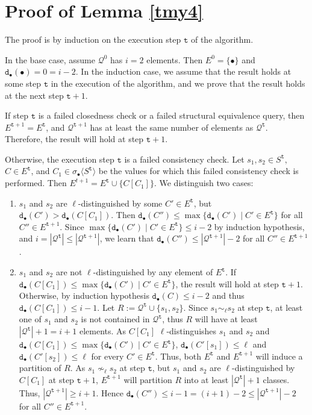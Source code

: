 \documentclass[preprint,12pt,english]{article}
\def\hole{\bullet}
\def\cQ{\mathcal{Q}}
\def\depth{\mathtt{d}}
\newcommand\pair[1]{\langle{#1}\rangle}
\def\ty{\mathtt{t}}
\begin{document}
\section{Proof of Lemma \ref{tmy4}}
The proof is by induction on the execution step $\ty$ of the algorithm.

In the base case, assume $\cQ^0$ has $i=2$ elements. Then $E^0=\{\hole\}$ and $\depth_\hole(\hole)=0=i-2.$
In the induction case, we assume that the result holds at some step $\ty$ in the execution of the algorithm, and we prove that the result holds at the next step $\ty+1.$ 

If step $\ty$ is a failed closedness check or a failed structural equivalence query, then $E^{\ty+1}=E^{\ty}$, and $\cQ^{\ty+1}$ has at least the same number of elements as $\cQ^{\ty}.$ Therefore, the result will hold at step $\ty+1.$

Otherwise, the execution step $\ty$ is a failed consistency check. Let $s_1,s_2\in S^\ty,$ $C\in E^\ty$, and $C_1\in\sigma_\hole\pair{S^\ty}$ be the values for which this failed consistency check is performed. Then $E^{t+1}=E^{\ty}\cup\{C[C_1]\}$. We distinguish two cases:
\begin{enumerate}
\item $s_1$ and $s_2$ are  $\ell$-distinguished by some $C'\in E^{\ty}$, but  $\depth_\hole(C')>\depth_\hole(C[C_1]).$ Then  $\depth_\hole(C'')\leq \max\{\depth_\hole(C')\mid C'\in E^{\ty}\}$ for all $C''\in E^{\ty+1}$. Since $\max\{\depth_\hole(C')\mid C'\in E^{\ty}\}\leq i-2$  by induction hypothesis, and $i=|\cQ^{\ty}|\leq |\cQ^{\ty+1}|$, we learn that  $\depth_\hole(C'')\leq |\cQ^{\ty+1}|-2$ for all $C''\in E^{\ty+1}$.
\item $s_1$ and $s_2$ are not $\ell$-distinguished by any element of $E^{\ty}$. If $\depth_\hole(C[C_1])\leq\max \{\depth_\hole(C')\mid C'\in E^{\ty}\}$, the result will hold at step $\ty+1$. Otherwise, by induction hypothesis $\depth_\hole(C)\leq i-2$ and thus $\depth_\hole(C[C_1])\leq i-1.$ Let $R:=\cQ^{\ty}\cup\{s_1,s_2\}.$ Since $s_1\sim_\ell s_2$ at step $\ty$, at least one of $s_1$ and $s_2$ is not contained in $\cQ^{\ty}$, thus $R$ will have at least $|\cQ^{\ty}|+1=i+1$ elements. As $C[C_1]$ $\ell$-distinguishes  $s_1$ and $s_2$ and $\depth_\hole(C[C_1])\leq\max \{\depth_\hole(C')\mid C'\in E^{\ty}\}$, $\depth_\hole(C'[s_1])\leq \ell$ and $\depth_\hole(C'[s_2])\leq \ell$ for every $C'\in E^{\ty}.$ Thus, both $E^{\ty}$ and $E^{\ty+1}$ will induce a partition of $R$. As $s_1\nsim_\ell s_2$ at step $\ty$, but $s_1$ and $s_2$ are $\ell$-distinguished by $C[C_1]$ at step $\ty+1$, $E^{\ty+1}$ will partition $R$ into at least $|\cQ^{\ty}|+1$ classes. Thus, $|\cQ^{\ty+1}|\geq i+1$. Hence $\depth_\hole(C'')\leq i-1=(i+1)-2\leq|\cQ^{\ty+1}|-2$ for all $C''\in E^{\ty+1}.$ 
 \end{enumerate}
\end{document}
